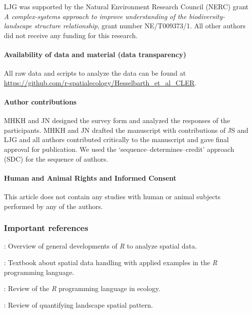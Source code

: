 \documentclass[smallextended]{svjour3}       %
\begin{document}
LJG was supported by the Natural Environment Research Council (NERC) grant \emph{A complex-systems approach to improve understanding of the biodiversity-landscape structure relationship}, grant number NE/T009373/1.
All other authors did not receive any funding for this research.

\hypertarget{availability-of-data-and-material-data-transparency}{%
\paragraph{Availability of data and material (data transparency)}\label{availability-of-data-and-material-data-transparency}}

All raw data and scripts to analyze the data can be found at \url{https://github.com/r-spatialecology/Hesselbarth_et_al_CLER}.

\hypertarget{author-contributions}{%
\paragraph{Author contributions}\label{author-contributions}}

MHKH and JN designed the survey form and analyzed the responses of the participants.
MHKH and JN drafted the manuscript with contributions of JS and LJG and all authors contributed critically to the manuscript and gave final approval for publication.
We used the `sequence--determines--credit' approach (SDC) for the sequence of authors.

\hypertarget{human-and-animal-rights-and-informed-consent}{%
\paragraph{Human and Animal Rights and Informed Consent}\label{human-and-animal-rights-and-informed-consent}}

This article does not contain any studies with human or animal subjects performed by any of the authors.

\hypertarget{important-references}{%
\subsubsection{Important references}\label{important-references}}

\noindent \textbullet \textbullet \cite{Bivand2020}: Overview of general developments of \emph{R} to analyze spatial data.

\noindent \textbullet \textbullet \cite{Lovelace2019}: Textbook about spatial data handling with applied examples in the \emph{R} programming language.

\noindent \textbullet \cite{Lai2019}: Review of the \emph{R} programming language in ecology.

\noindent \textbullet \cite{Gustafson2019}: Review of quantifying landscape spatial pattern.




\end{document}
